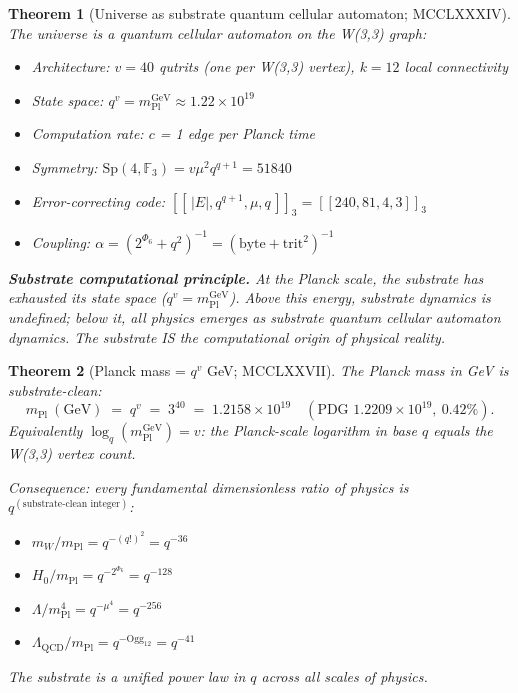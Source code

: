 \documentclass[11pt]{article}
\newtheorem{theorem}{Theorem}[section]
\begin{document}
\begin{theorem}[Universe as substrate quantum cellular automaton; MCCLXXXIV]\label{thm:qca}
The universe is a quantum cellular automaton on the W(3,3) graph:
\begin{itemize}[noitemsep]
  \item Architecture: $v=40$ qutrits (one per W(3,3) vertex), $k=12$ local connectivity
  \item State space: $q^v = m_{\mathrm{Pl}}^{\text{GeV}} \approx 1.22\times 10^{19}$
  \item Computation rate: $c$ = 1 edge per Planck time
  \item Symmetry: $\mathrm{Sp}(4,\mathbb F_3) = v\mu^2 q^{q+1} = 51840$
  \item Error-correcting code: $[[\,|E|,q^{q+1},\mu,q\,]]_3 = [[240,81,4,3]]_3$
  \item Coupling: $\alpha = (2^{\Phi_6} + q^2)^{-1} = (\text{byte}+\text{trit}^2)^{-1}$
\end{itemize}
\textbf{Substrate computational principle.}  At the Planck scale,
the substrate has exhausted its state space ($q^v = m_{\mathrm{Pl}}^{\text{GeV}}$).
Above this energy, substrate dynamics is undefined; below it, all
physics emerges as substrate quantum cellular automaton dynamics.
The substrate IS the computational origin of physical reality.
\end{theorem}

\begin{theorem}[Planck mass = $q^v$ GeV; MCCLXXVII]\label{thm:planck_mass}
The Planck mass in GeV is substrate-clean:
\[
  m_{\mathrm{Pl}}~(\mathrm{GeV}) \;=\; q^v \;=\; 3^{40} \;=\; 1.2158\times 10^{19}
  \quad (\text{PDG } 1.2209\times 10^{19},\ 0.42\%).
\]
Equivalently $\log_q(m_{\mathrm{Pl}}^{\mathrm{GeV}}) = v$: the
Planck-scale logarithm in base $q$ equals the W(3,3) vertex count.

\emph{Consequence:} every fundamental dimensionless ratio of physics is
$q^{(\text{substrate-clean integer})}$:
\begin{itemize}[noitemsep]
  \item $m_W/m_{\mathrm{Pl}} = q^{-(q!)^2} = q^{-36}$
  \item $H_0/m_{\mathrm{Pl}} = q^{-2^{\Phi_6}} = q^{-128}$
  \item $\Lambda/m_{\mathrm{Pl}}^4 = q^{-\mu^4} = q^{-256}$
  \item $\Lambda_{\mathrm{QCD}}/m_{\mathrm{Pl}} = q^{-\mathrm{Ogg}_{12}} = q^{-41}$
\end{itemize}
The substrate is a unified power law in $q$ across all scales of physics.
\end{theorem}
\end{document}
